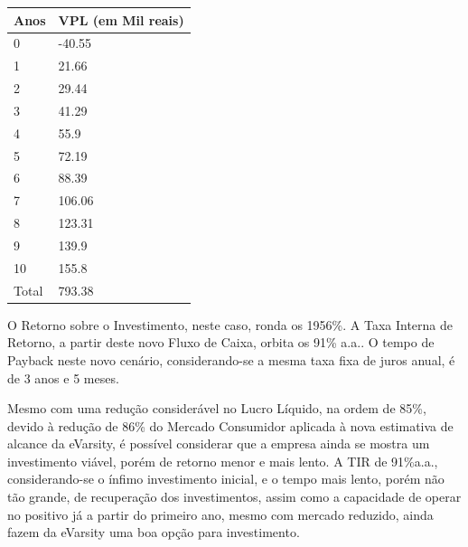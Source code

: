 \documentclass[a4paper, 12pt]{paper}
\begin{document}
	\begin{table}[ht]
		\centering
		\begin{tabular}{p{3cm}p{5cm}}
			\hline
			\cellcolor{gray}Anos &\cellcolor{gray}VPL (em Mil reais) \\ \hline
	0 & -40.55 \\
	1 & 21.66 \\
	2 & 29.44 \\
	3 & 41.29 \\
	4 & 55.9 \\
	5 & 72.19 \\
	6 & 88.39 \\
	7 & 106.06 \\
	8 & 123.31 \\
	9 & 139.9 \\
	10 & 155.8 \\
	Total & 793.38 \\
		\end{tabular}
	\end{table}

O Retorno sobre o Investimento, neste caso, ronda os 1956\%. A Taxa Interna de Retorno, a partir deste novo Fluxo de Caixa, orbita os 91\% a.a.. O tempo de Payback neste novo cenário, considerando-se a mesma taxa fixa de juros anual, é de 3 anos e 5 meses.

Mesmo com uma redução considerável no Lucro Líquido, na ordem de 85\%, devido à redução de 86\% do Mercado Consumidor aplicada à nova estimativa de alcance da eVarsity, é possível considerar que a empresa ainda se mostra um investimento viável, porém de retorno menor e mais lento. A TIR de 91\%a.a., considerando-se o ínfimo investimento inicial, e o tempo mais lento, porém não tão grande, de recuperação dos investimentos, assim como a capacidade de operar no positivo já a partir do primeiro ano, mesmo com mercado reduzido, ainda fazem da eVarsity uma boa opção para investimento.
\end{document}

